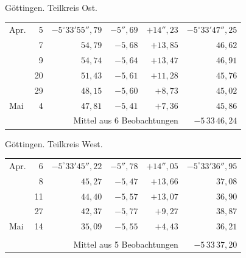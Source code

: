 \noindent\begin{minipage}[t]{.495\textwidth}\centering Göttingen. Teilkreis Ost.\par\smallskip
{\scriptsize\setlength{\tabcolsep}{1pt}\renewcommand{\arraystretch}{1.2}\begin{tabular}{lr|r|r|r|r|}
Apr.&5&$-5^\circ33'55''{,}79$&$-5''{,}69$&$+14''{,}23$&$-5^\circ33'47''{,}25$\\
&7&$54{,}79$&$-5{,}68$&$+13{,}85$&$46{,}62$\\
&9&$54{,}74$&$-5{,}64$&$+13{,}47$&$46{,}91$\\
&20&$51{,}43$&$-5{,}61$&$+11{,}28$&$45{,}76$\\
&29&$48{,}15$&$-5{,}60$&$+8{,}73$&$45{,}02$\\
Mai&4&$47{,}81$&$-5{,}41$&$+7{,}36$&$45{,}86$\\
\cline{6-6}\multicolumn{5}{r}{Mittel aus 6 Beobachtungen}&$-5\,33\,46{,}24$
\end{tabular}}\end{minipage}\hfill\begin{minipage}[t]{.495\textwidth}\centering Göttingen. Teilkreis West.\par\smallskip
{\scriptsize\setlength{\tabcolsep}{1pt}\renewcommand{\arraystretch}{1.2}\begin{tabular}{lr|r|r|r|r}
Apr.&6&$-5^\circ33'45''{,}22$&$-5''{,}78$&$+14''{,}05$&$-5^\circ33'36''{,}95$\\
&8&$45{,}27$&$-5{,}47$&$+13{,}66$&$37{,}08$\\
&11&$44{,}40$&$-5{,}57$&$+13{,}07$&$36{,}90$\\
&27&$42{,}37$&$-5{,}77$&$+9{,}27$&$38{,}87$\\
Mai&14&$35{,}09$&$-5{,}55$&$+4{,}43$&$36{,}21$\\
&&&&&\\
\cline{6-6}\multicolumn{5}{r}{Mittel aus 5 Beobachtungen}&$-5\,33\,37{,}20$
\end{tabular}}\end{minipage}
\par\vspace{4mm}


